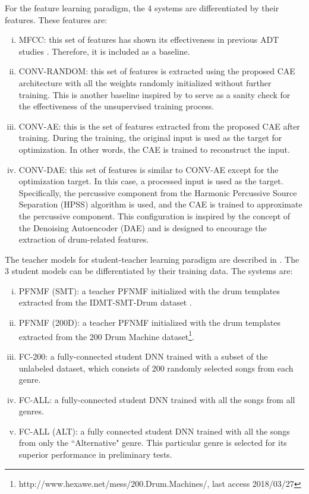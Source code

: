 \documentclass{article}
\begin{document}
For the feature learning paradigm, the 4 systems are differentiated by their features. These features are: 
\begin{enumerate}[(i)]
\item MFCC: this set of features has shown its effectiveness in previous ADT studies \cite{PaulusK09_DrumTransHMM_JASMP, Thompson2014, SouzaBN15_CymbalClassi_IJCNN}. Therefore, it is included as a baseline.   
\item CONV-RANDOM: this set of features is extracted using the proposed CAE architecture with all the weights randomly initialized without further training. This is another baseline inspired by \cite{Choi2017a} to serve as a sanity check for the effectiveness of the unsupervised training process.  
\item CONV-AE: this is the set of features extracted from the proposed CAE after training. During the training, the original input is used as the target for optimization. In other words, the CAE is trained to reconstruct the input. 
\item CONV-DAE: this set of features is similar to CONV-AE except for the optimization target. In this case, a processed input is used as the target. Specifically, the percussive component from the Harmonic Percussive Source Separation (HPSS) \cite{Fitzgerald2010} algorithm is used, and the CAE is trained to approximate the percussive component. This configuration is inspired by the concept of the Denoising Autoencoder (DAE) \cite{Vincent2008} and is designed to encourage the extraction of drum-related features. 
\end{enumerate}

The teacher models for student-teacher learning paradigm are described in \cite{Wu2017}. The 3 student models can be differentiated by their training data. The systems are: 
\begin{enumerate}[(i)]
\item PFNMF (SMT): a teacher PFNMF initialized with the drum templates extracted from the IDMT-SMT-Drum dataset \cite{DittmarG14_DrumTranscription_DAFX}.
\item PFNMF (200D): a teacher PFNMF initialized with the drum templates extracted from the 200 Drum Machine dataset\footnote{http://www.hexawe.net/mess/200.Drum.Machines/, last access 2018/03/27}.
\item FC-200: a fully-connected student DNN trained with a subset of the unlabeled dataset, which consists of 200 randomly selected songs from each genre. 
\item FC-ALL: a fully-connected student DNN trained with all the songs from all genres.
\item FC-ALL (ALT): a fully connected student DNN trained with all the songs from only the ``Alternative" genre. This particular genre is selected for its superior performance in preliminary tests. 
\end{enumerate}
\end{document}
